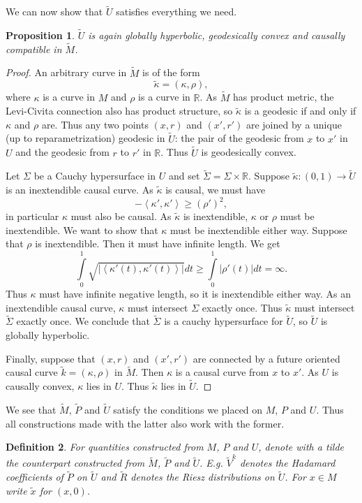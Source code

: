 \documentclass[11pt]{article}
\def\<{\left\langle}
\def\>{\right\rangle}
\def\R{{\mathbb{R}}}
\newtheorem{df}{Definition}[section]
\newtheorem{prop}[df]{Proposition}
\begin{document}
We can now show that $\tilde U$ satisfies everything we need.
\begin{prop}
	$\tilde U$ is again globally hyperbolic, geodesically convex and causally compatible in $\tilde M$.
\end{prop}
\begin{proof}
	An arbitrary curve in $\tilde M$ is of the form
	\[\tilde \kappa=(\kappa,\rho),\]
	where $\kappa$ is a curve in $M$ and $\rho$ is a curve in $\R$. As $\tilde M$ has product metric, the Levi-Civita connection also has product structure, so $\tilde \kappa$ is a geodesic if and only if $\kappa$ and $\rho$ are.
	Thus any two points $(x,r)$ and $(x',r')$ are joined by a unique (up to reparametrization) geodesic in $\tilde U$: the pair of the geodesic from $x$ to $x'$ in $U$ and the  geodesic from $r$ to $r'$ in $\R$. Thus $\tilde U$ is geodesically convex.

	Let $\Sigma$ be a Cauchy hypersurface in $U$ and set $\tilde \Sigma=\Sigma\times \R$. Suppose $\tilde\kappa\colon (0,1)\rightarrow \tilde U$ is an inextendible causal curve.  As $\tilde\kappa$ is causal, we must have \[-\<\kappa',\kappa'\>\geq (\rho')^2,\]
	in particular $\kappa$ must also be causal.  As $\tilde \kappa$ is inextendible, $\kappa$ or $\rho$ must be inextendible. We want to show that $\kappa$ must be inextendible either way.
	Suppose that $\rho$ is inextendible. Then it must have infinite length. We get
	\[\int\limits_0^1 \sqrt{|\<\kappa'(t),\kappa'(t)\>|}dt\geq \int\limits_0^1 |\rho'(t)|dt=\infty.\]
	Thus $\kappa$ must have infinite negative length, so it is inextendible either way. As an inextendible causal curve, $\kappa$ must intersect $\Sigma$ exactly once. Thus $\tilde \kappa$ must intersect $\tilde \Sigma$ exactly once. We conclude that $\tilde \Sigma$ is a cauchy hypersurface for $\tilde U$, so $\tilde U$ is globally hyperbolic.

	Finally, suppose that $(x,r)$ and $(x',r')$ are connected by a future oriented causal curve $\tilde k=(\kappa,\rho)$ in $\tilde M$. Then $\kappa$ is a causal curve from $x$ to $x'$. As $U$ is causally convex, $\kappa$ lies in $U$. Thus $\tilde \kappa$ lies in $\tilde U$.
\end{proof}
We see that $\tilde M$, $\tilde P$ and $\tilde U$ satisfy the conditions we placed on $M$, $P$ and $U$. Thus all constructions made with the latter also work with the former.
\begin{df}
	\label{dftilde}
	For quantities constructed from $M$, $P$ and $U$, denote with a tilde the counterpart constructed from $\tilde M$, $\tilde P$ and $\tilde U$. E.g. $\tilde V^k$ denotes the Hadamard coefficients of $\tilde P$ on $\tilde U$ and $\tilde R$ denotes the Riesz distributions on $\tilde U$. For $x\in M$ write $\tilde x$ for $(x,0)$.
\end{df}
\end{document}
